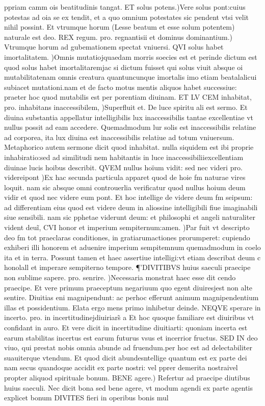 \documentclass{article}
\begin{document}
\begin{pages}
ppriam camm ois beatitudinis tangat. ET solus potens.)Vere solus pont:cuius potestas ad oia se ex tendit, et a quo omnium potestates sic pendent vtsi velit nihil possint. Et vtrumque horum (Lesse beatum et esse solum potentem) naturale est deo. REX regum. pro. regnantisii et dominus dominantium.) Vtrumque horum ad gubemationem spectat vniuersi. QVI solus habet imortalitatem. )Omnis mutatiojquaedam morris soecies est et perinde dictum est quod solus habet imortalitaremjac si dictum fuisset qui solus viuit absque oi mutabilitatenam omnis creatura quantuncunque imortalis imo etiam beatalalicui subiacet mutationi.nam et de facto motus mentis aliquos habet successiue: praeter hoc quod mutabilis est per porentiam diuinam. ET LV CEM inhabitat, pro. inhabitans inaccessibilem, )Superfluit et. De luce spiritu ali est sermo. Et diuina substantia appellatur intelligibilis lux inaccessibilis tantae excellentiae vt nullus possit ad eam accedere. Quemadmodum lur solis est inaccessibilis relatine ad corporea, ita lux diuina est inaccessibilis relatiue ad totum vniuersum. Metaphorico autem sermone dicit quod inhabitat. nulla siquidem est ibi proprie inhabiratio:sed ad similitudi nem habitantis in luce inaccessibiliiexcellentiam diuinae lucis hoibus describit. QVEM nullus hoïum vidit: sed nec videri pro. videreipont )Ex hac secunda particula apparet quod de hoie fm naturae vires loquit. nam sic absque omni controuerlia verificatur quod nullus hoium deum vidir et quod nec videre eum pont. Et hoc intellige de videre deum fm seipsum: ad differentiam eius quod est videre deum in aliossine intelligibili fiue imaginabili siue sensibili. nam sic pphetae viderunt deum: et philosophi et angeli naturaliter vident deuĩ, CVI honor et imperium sempiternum:amen. )Par fuit vt descripto deo fm tot praeclaras conditiones, in gratiarumactiones prorumperet: cupiendo exhiberi illi honorem et aduenire imperium sempitemnum quemadmodum in coelo ita et in terra. Possunt tamen et haec assertiue intelligi:vt etiam describat deum c honolall et imperare sempiterno tempore.  \pend\pstart ¶’DIVITIBVS huius saeculi praecipe non sublime sapere. pro. senrire. )Necessaria monstrat haec esse dit cendo praecipe. Et vere primum praeceptum negariuum quo egent diuiresjest non alte sentire. Diuitias eni magnipendunt: ac perhoc efferunt animum magnipendentium illas et possidentium. Elata ergo mens primo inhibetur deinde. NEQVE sperare in incerto. pro. in incertitudinejdiuiriars̃ a Et hoc quoque familiare est diuiribus vt confidant in auro. Et vere dicit in incertitudine diuitiarti: quoniam incerta est earum stabilitas incertus est earum futurus vsus et incerrior fructus. SED IN deo viuo, qui prestat nobis omnia abunde ad fruendum.per hoc est ad delectabiliter suauiterque vtendum. Et quod dicit abundesntellige quantum est ex parte dei nam secus quandoque accidit ex parte nostri: vel pprer demerita nostraivel propter aliquod spirituale bonum. BENE agere.) Refertur ad praecipe diutibus huius saeculi. Nec dicit bona sed bene agere, vt modum agendi ex parte agentis explicet bonum DIVITES fieri in operibus bonis mul\pend
\marginpar{[ p.147 ]}

\end{pages}
\end{document}
